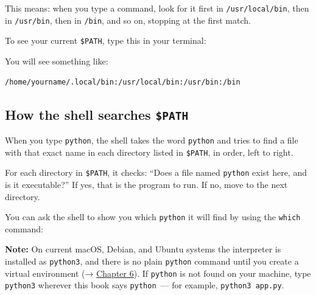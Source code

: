 \noindent{}This means: when you type a command, look for it first in \texttt{/usr/local/bin}, then in \texttt{/usr/bin}, then in \texttt{/bin}, and so on, stopping at the first match.

To see your current \texttt{\$PATH}, type this in your terminal:

\begin{codebox}[short]

\begin{Shaded}
\begin{Highlighting}[]
 
\end{Highlighting}
\end{Shaded}

\end{codebox}

\noindent{}You will see something like:

\begin{outputbox}[short]
\begin{Verbatim}[fontsize=\codesize, breaklines, breakanywhere, breaksymbolleft={\tiny\textcolor{muted}{$\hookrightarrow$}}]
/home/yourname/.local/bin:/usr/local/bin:/usr/bin:/bin
\end{Verbatim}
\end{outputbox}

\subsection*{\texorpdfstring{How the shell searches \texttt{\$PATH}}{How the shell searches \$PATH}}\label{01-command-to-process:how-the-shell-searches-path}

When you type \texttt{python}, the shell takes the word \texttt{python} and tries to find a file with that exact name in each directory listed in \texttt{\$PATH}, in order, left to right.

For each directory in \texttt{\$PATH}, it checks: ``Does a file named \texttt{python} exist here, and is it executable?'' If yes, that is the program to run. If no, move to the next directory.

You can ask the shell to show you which \texttt{python} it will find by using the \texttt{which} command:

\begin{notebox}

\textbf{Note:} On current macOS, Debian, and Ubuntu systems the interpreter is installed as \texttt{python3}, and there is no plain \texttt{python} command until you create a virtual environment (→ \hyperref[ch:06-local-dependencies]{Chapter 6}). If \texttt{python} is not found on your machine, type \texttt{python3} wherever this book says \texttt{python}~--- for example, \texttt{python3\ app.py}.

\end{notebox}

